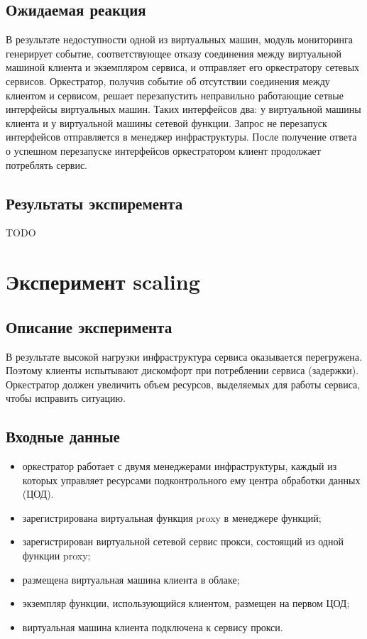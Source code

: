 \documentclass[oneside,final,14pt,a4paper]{extreport}
\begin{document}
\subsection{Ожидаемая реакция}
В результате недоступности одной из виртуальных машин, модуль мониторинга генерирует событие, соответствующее отказу соединения между виртуальной машиной клиента и экземпляром сервиса, и отправляет его оркестратору сетевых сервисов. Оркестратор, получив событие об отсутствии соединения между клиентом и сервисом, решает перезапустить неправильно работающие сетвые интерфейсы виртуальных машин. Таких интерфейсов два: у виртуальной машины клиента и у виртуальной машины сетевой функции. Запрос не перезапуск интерфейсов отправляется в менеджер инфраструктуры. После получение ответа о успешном перезапуске интерфейсов оркестратором клиент продолжает потреблять сервис.

\subsection{Результаты экспиремента}
TODO

\section{Эксперимент scaling}
\subsection{Описание эксперимента}
В результате высокой нагрузки инфраструктура сервиса оказывается перегружена. Поэтому клиенты испытывают дискомфорт при потреблении сервиса (задержки). Оркестратор должен увеличить объем ресурсов, выделяемых для работы сервиса, чтобы исправить ситуацию.

\subsection{Входные данные}
\begin{itemize}
	\item оркестратор работает с двумя менеджерами инфраструктуры, каждый из которых управляет ресурсами подконтрольного ему центра обработки данных (ЦОД).
	\item зарегистрирована виртуальная функция proxy в менеджере функций;
	\item зарегистрирован виртуальной сетевой сервис прокси, состоящий из одной функции proxy;
	\item размещена виртуальная машина клиента в облаке;
	\item экземпляр функции, использующийся клиентом, размещен на первом ЦОД;
	\item виртуальная машина клиента подключена к сервису прокси.
\end{itemize}
\end{document}

